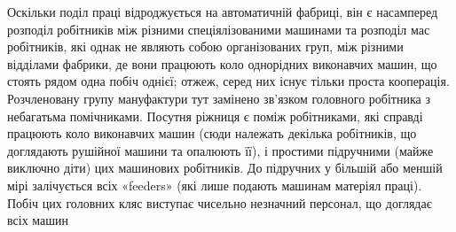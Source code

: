 Оскільки поділ праці відроджується на автоматичній фабриці,
він є насамперед розподіл робітників між різними спеціялізованими
машинами та розподіл мас робітників, які однак не являють
собою організованих груп, між різними відділами фабрики, де
вони працюють коло однорідних виконавчих машин, що стоять
рядом одна побіч однієї; отжеж, серед них існує тільки проста
кооперація. Розчленовану групу мануфактури тут замінено
зв’язком головного робітника з небагатьма помічниками. Посутня
ріжниця є поміж робітниками, які справді працюють коло виконавчих
машин (сюди належать декілька робітників, що доглядають
рушійної машини та опалюють її), і простими підручними
(майже виключно діти) цих машинових робітників. До підручних
у більшій або меншій мірі залічується всіх «feeders» (які
лише подають машинам матеріял праці). Побіч цих головних кляс
виступає чисельно незначний персонал, що доглядає всіх машин
\parbreak{}  %
